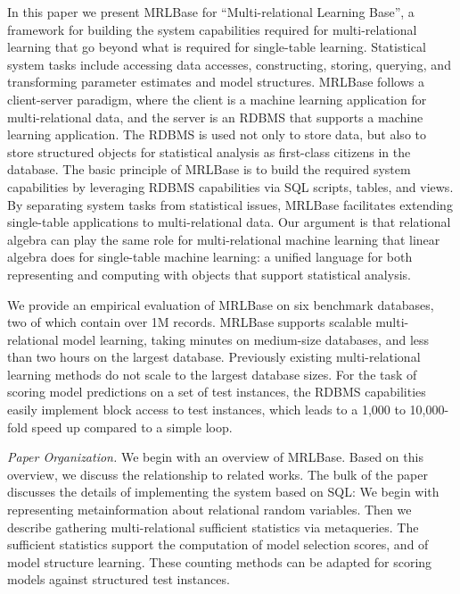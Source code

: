 \documentclass{acm_proc_article-sp}
\begin{document}
In this paper we present MRLBase for ``Multi-relational Learning Base'', a framework for building the system capabilities required for multi-relational learning that go beyond what is required for single-table learning. Statistical system tasks include accessing data accesses, constructing, storing, querying, and transforming parameter estimates and model structures. MRLBase follows a client-server paradigm, where the client is a machine learning application for multi-relational data, and the server is an RDBMS that supports a machine learning application. The RDBMS is used not only to store data, but also to store structured objects for statistical analysis as first-class citizens in the database. 
The basic principle of MRLBase is to build the required system capabilities by leveraging RDBMS capabilities via SQL scripts, tables, and views.  
By separating system tasks from statistical issues, MRLBase facilitates extending single-table applications to multi-relational data.
Our argument is that relational algebra can play the same role for multi-relational machine learning that linear algebra does for single-table machine learning:  a unified language for both representing and computing with objects that support statistical analysis. 



We provide an empirical evaluation of MRLBase on six benchmark databases, two of which contain over 1M records. 
MRLBase supports scalable multi-relational model learning, taking minutes on medium-size databases, and less than two hours on the largest database. Previously existing multi-relational learning methods do not scale to the largest database sizes. 
For the task of scoring model predictions on a set of test instances, the RDBMS capabilities easily implement block access to test instances, which leads to a 1,000 to 10,000-fold speed up compared to a simple loop.

{\em Paper Organization.} We begin with an overview of MRLBase. Based on this overview, we discuss the relationship to related works. The bulk of the paper discusses the details of implementing the system based on SQL: We begin with representing metainformation about relational random variables. Then we describe gathering multi-relational sufficient statistics via metaqueries. The sufficient statistics support the computation of model selection scores, and of model structure learning. These counting methods can be adapted for scoring models against   structured test instances. 
\end{document}
